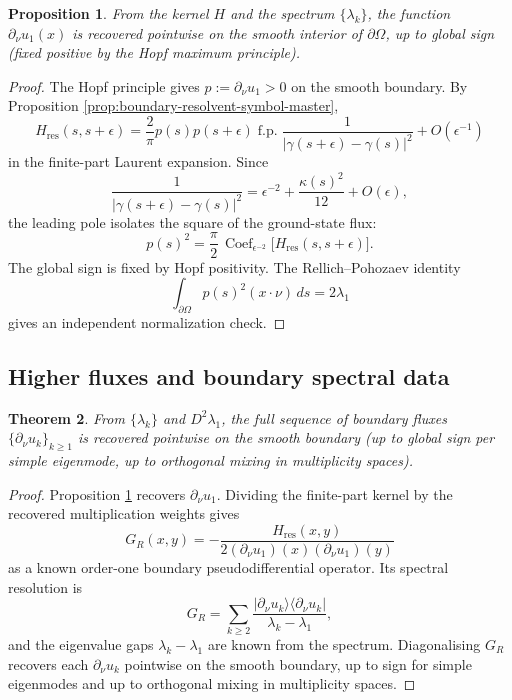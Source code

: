 \documentclass[11pt,reqno]{amsart}
\theoremstyle{plain}
\newtheorem{theorem}{Theorem}[section]
\newtheorem{proposition}[theorem]{Proposition}
\theoremstyle{definition}
\theoremstyle{remark}
\begin{document}
\begin{proposition}\label{prop:flux-1-recovery-master}
From the kernel $H$ and the spectrum $\{\lambda_k\}$, the function $\partial_\nu u_1(x)$ is recovered pointwise on the smooth interior of $\partial\Omega$, up to global sign (fixed positive by the Hopf maximum principle).
\end{proposition}

\begin{proof}
The Hopf principle gives $p:=\partial_\nu u_1>0$ on the smooth boundary. By Proposition \ref{prop:boundary-resolvent-symbol-master},
\[
H_{\mathrm{res}}(s,s+\epsilon)
=\frac{2}{\pi}p(s)p(s+\epsilon)
\operatorname{f.p.}\frac{1}{|\gamma(s+\epsilon)-\gamma(s)|^2}
+O(\epsilon^{-1})
\]
in the finite-part Laurent expansion. Since
\[
\frac{1}{|\gamma(s+\epsilon)-\gamma(s)|^2}
=\epsilon^{-2}+\frac{\kappa(s)^2}{12}+O(\epsilon),
\]
the leading pole isolates the square of the ground-state flux:
\[
p(s)^2=\frac{\pi}{2}\,
\operatorname{Coef}_{\epsilon^{-2}}
\bigl[H_{\mathrm{res}}(s,s+\epsilon)\bigr].
\]
The global sign is fixed by Hopf positivity. The Rellich--Pohozaev identity
\[
\int_{\partial\Omega}p(s)^2(x\cdot\nu)\,ds=2\lambda_1
\]
gives an independent normalization check.
\end{proof}

\subsection{Higher fluxes and boundary spectral data}\label{ss:higher-fluxes-master}

\begin{theorem}\label{thm:full-flux-recovery-master}
From $\{\lambda_k\}$ and $D^2\lambda_1$, the full sequence of boundary fluxes $\{\partial_\nu u_k\}_{k\geq 1}$ is recovered pointwise on the smooth boundary (up to global sign per simple eigenmode, up to orthogonal mixing in multiplicity spaces).
\end{theorem}

\begin{proof}
Proposition \ref{prop:flux-1-recovery-master} recovers $\partial_\nu u_1$. Dividing the finite-part kernel by the recovered multiplication weights gives
\[
G_R(x, y) = -\frac{H_{\mathrm{res}}(x, y)}
{2(\partial_\nu u_1)(x)(\partial_\nu u_1)(y)}
\]
as a known order-one boundary pseudodifferential operator. Its spectral resolution is
\[
G_R=\sum_{k\geq2}\frac{|\partial_\nu u_k\rangle\langle\partial_\nu u_k|}{\lambda_k-\lambda_1},
\]
and the eigenvalue gaps $\lambda_k-\lambda_1$ are known from the spectrum. Diagonalising $G_R$ recovers each $\partial_\nu u_k$ pointwise on the smooth boundary, up to sign for simple eigenmodes and up to orthogonal mixing in multiplicity spaces.
\end{proof}
\end{document}
